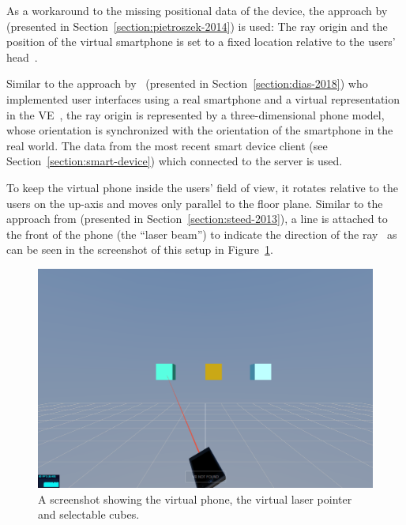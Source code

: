 As a workaround to the missing positional data of the device, the approach by \citeauthor{Pietroszek.2014} (presented in Section~\ref{section:pietroszek-2014}) is used: The ray origin and the position of the virtual smartphone is set to a fixed location relative to the users' head~\cite[Figure 3]{Pietroszek.2014}. %

Similar to the approach by~\citeauthor{Dias.2018} (presented in Section~\ref{section:dias-2018}) who implemented user interfaces using a real smartphone and a virtual representation in the \gls{VE}~\cite[5]{Dias.2018}, the ray origin is represented by a three-dimensional phone model, whose orientation is synchronized with the orientation of the smartphone in the real world. The data from the most recent smart device client (see Section~\ref{section:smart-device}) which connected to the server is used.

To keep the virtual phone inside the users' field of view, it rotates relative to the users on the up-axis and moves only parallel to the floor plane.
Similar to the approach from \citeauthor{Steed.2013} (presented in Section~\ref{section:steed-2013}), a line is attached to the front of the phone (the \enquote{laser beam}) to indicate the direction of the ray~\cite[46]{Steed.2013} as can be seen in the screenshot of this setup in Figure~\ref{fig:screenshot-exp-lp}.

\begin{figure}[H]
	\centering
	\includegraphics[width=12cm]{figures/experiments/screenshot_exp_lp.png}
	\caption[Screenshot of the laser pointer]{A screenshot showing the virtual phone, the virtual laser pointer and selectable cubes.}\label{fig:screenshot-exp-lp}
\end{figure}

